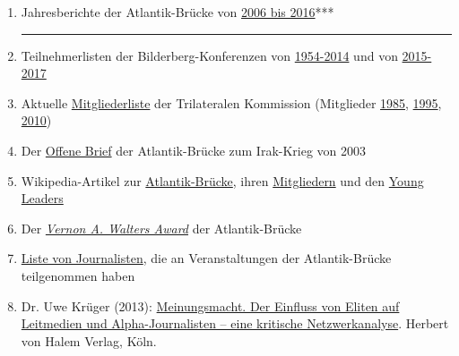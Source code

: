 \begin{enumerate}
\def\labelenumi{\arabic{enumi}.}
\tightlist
\item
  Jahresberichte der Atlantik-Brücke von
  \href{https://www.atlantik-bruecke.org/unsere-arbeit/publikationen/jahresberichte/}{2006
  bis 2016}***

  \begin{center}\rule{0.5\linewidth}{\linethickness}\end{center}
\item
  Teilnehmerlisten der Bilderberg-Konferenzen von
  \href{https://swprs.files.wordpress.com/2016/07/bilderberg_teilnehmer_1954-2014.pdf}{1954-2014}
  und von
  \href{https://www.bilderbergmeetings.org/meetings/meetings-overview/index.html}{2015-2017}
\item
  Aktuelle
  \href{https://swprs.files.wordpress.com/2017/07/trilateral-commission-members-2017.pdf}{Mitgliederliste}
  der Trilateralen Kommission (Mitglieder
  \href{https://swprs.files.wordpress.com/2017/07/trilateral-commission-members-1985.pdf}{1985},
  \href{https://swprs.files.wordpress.com/2017/07/trilateral-commission-members-1995.pdf}{1995},
  \href{https://swprs.files.wordpress.com/2017/07/trilateral-commission-members-2010.pdf}{2010})
\item
  Der
  \href{https://swprs.files.wordpress.com/2018/02/a-message-to-the-people-of-the-united-states-of-america.pdf}{Offene
  Brief} der Atlantik-Brücke zum Irak-Krieg von 2003
\item
  Wikipedia-Artikel zur
  \href{https://de.wikipedia.org/wiki/Atlantik-Br\%C3\%BCcke}{Atlantik-Brücke},
  ihren
  \href{https://de.wikipedia.org/wiki/Liste_von_Mitgliedern_der_Atlantik-Br\%C3\%BCcke}{Mitgliedern}
  und den
  \href{https://web.archive.org/web/20170627193020/https://de.wikipedia.org/wiki/Liste_von_Young_Leaders_der_Atlantik-Br\%C3\%BCcke}{Young
  Leaders}
\item
  Der
  \href{https://de.wikipedia.org/wiki/Vernon_A._Walters_Award}{\emph{Vernon
  A. Walters Award}} der Atlantik-Brücke
\item
  \href{http://spiegelkabinett-blog.blogspot.com/2013/03/journalisten-der-atlantikbrucke-in.html}{Liste
  von Journalisten}, die an Veranstaltungen der Atlantik-Brücke
  teilgenommen haben
\item
  Dr. Uwe Krüger (2013):
  \href{http://www.halem-verlag.de/meinungsmacht-und-elite-journalismus/}{Meinungsmacht.
  Der Einfluss von Eliten auf Leitmedien und Alpha-Journalisten -- eine
  kritische Netzwerkanalyse}. Herbert von Halem Verlag, Köln.
\end{enumerate}

